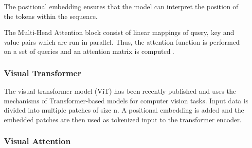 The positional embedding ensures that the model can interpret the position of the tokens within the sequence.

The Multi-Head Attention block consist of linear mappings of query, key and value pairs which are run in parallel. Thus, the attention function is performed on a set of queries and an attention matrix is computed \cite{vaswani_attention_2023}.

\subsubsection{Visual Transformer}

The visual transformer model (ViT) has been recently published \cite{dosovitskiy_image_2021} and uses the mechanisms of Transformer-based models for computer vision tasks. Input data is divided into multiple patches of size n. A positional embedding is added and the embedded patches are then used as tokenized input to the transformer encoder. 


\subsubsection{Visual Attention}